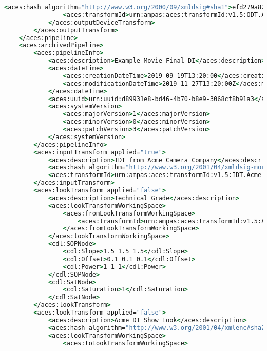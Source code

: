 \begin{lstlisting}[language=csh]
                <aces:hash algorithm="http://www.w3.org/2000/09/xmldsig#sha1">efd279a82c2d52ee8c49dc0793499dc86bb1a4a3fa0dfb420d59c2814c55aea6</aces:hash>
                <aces:transformId>urn:ampas:aces:transformId:v1.5:ODT.Academy.P3D60_48nits.a1.0.3</aces:transformId>
            </aces:outputDeviceTransform>
        </aces:outputTransform>
    </aces:pipeline>
    <aces:archivedPipeline>
        <aces:pipelineInfo>
            <aces:description>Example Movie Final DI</aces:description>
            <aces:dateTime>
                <aces:creationDateTime>2019-09-19T13:20:00</aces:creationDateTime>
                <aces:modificationDateTime>2019-11-27T13:20:00Z</aces:modificationDateTime>
            </aces:dateTime>
            <aces:uuid>urn:uuid:d89931e8-bd46-4b70-b8e9-3068cf8b91a3</aces:uuid>
            <aces:systemVersion>
                <aces:majorVersion>1</aces:majorVersion>
                <aces:minorVersion>0</aces:minorVersion>
                <aces:patchVersion>3</aces:patchVersion>
            </aces:systemVersion>
        </aces:pipelineInfo>
        <aces:inputTransform applied="true">
            <aces:description>IDT from Acme Camera Company</aces:description>
            <aces:hash algorithm="http://www.w3.org/2001/04/xmldsig-more#md5">1531ea6ef06c5b0a5bea80c94f60c7b68e3989e3c90b8ebd25c28aa4670c30f8</aces:hash>
            <aces:transformId>urn:ampas:aces:transformId:v1.5:IDT.Acme.Camera.a1.v1</aces:transformId>
        </aces:inputTransform>
        <aces:lookTransform applied="false">
            <aces:description>Technical Grade</aces:description>
            <aces:lookTransformWorkingSpace>
                <aces:fromLookTransformWorkingSpace>
                    <aces:transformId>urn:ampas:aces:transformId:v1.5:ACEScsc.Academy.ACEScct_to_ACES.a1.0.3</aces:transformId>
                </aces:fromLookTransformWorkingSpace>
            </aces:lookTransformWorkingSpace>
            <cdl:SOPNode>
                <cdl:Slope>1.5 1.5 1.5</cdl:Slope>
                <cdl:Offset>0.1 0.1 0.1</cdl:Offset>
                <cdl:Power>1 1 1</cdl:Power>
            </cdl:SOPNode>
            <cdl:SatNode>
                <cdl:Saturation>1</cdl:Saturation>
            </cdl:SatNode>
        </aces:lookTransform>
        <aces:lookTransform applied="false">
            <aces:description>Acme DI Show Look</aces:description>
            <aces:hash algorithm="http://www.w3.org/2001/04/xmlenc#sha256">e3b0c44298fc1c149afbf4c8996fb92427ae41e4649b934ca495991b7852b855</aces:hash>
            <aces:lookTransformWorkingSpace>
                <aces:toLookTransformWorkingSpace>

\end{lstlisting}
